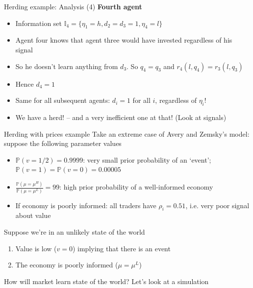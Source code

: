 \documentclass[english,10pt
,aspectratio=169
]{beamer}
\begin{document}
\begin{frame}{Herding example: Analysis (4)}
	\textbf{Fourth agent}
	\begin{itemize}
		\item Information set   $\mathbb{I}_4=\{\eta_1=h,d_2=d_3=1, \eta_4=l\}$
		\item Agent four knows that agent three would have invested regardless of his signal
		\item So he doesn't learn anything from $d_3$. So $q_4 = q_3$ and $r_4(l,q_4) = r_3(l,q_3)$
		\item Hence $d_4=1$
		\item Same for all subsequent agents: $d_i=1$ for all $i$, regardless of $\eta_i$!
		\item We have a herd! -- and a very inefficient one at that! (Look at signals) \hyperlink{HERD}{}
	\end{itemize}
\end{frame}



\begin{frame}{Herding with prices example} \label{layers}
	Take an extreme case of Avery and Zemsky's model: suppose the following parameter values
	\begin{itemize}
		\item $\mathbb{P}(v=1/2)=0.9999$: very small prior probability of an `event'; $\mathbb{P}(v=1)=\mathbb{P}(v=0)=0.00005$
		\item $\frac{\mathbb{P}(\mu=\mu^{H})}{\mathbb{P}(\mu=\mu^{L})}=99$: high prior probability of a well-informed economy
		\item If economy is poorly informed: all traders have $\rho_{i}=0.51$, i.e. very poor signal about value
	\end{itemize}
	Suppose we're in an unlikely state of the world
	\begin{enumerate}
		\item Value is low ($v=0$) implying that there is an event
		\item The economy is poorly informed ($\mu=\mu^L$)
	\end{enumerate}
	How will  market learn state of the world? Let's look at a  simulation
\end{frame}
\end{document}
